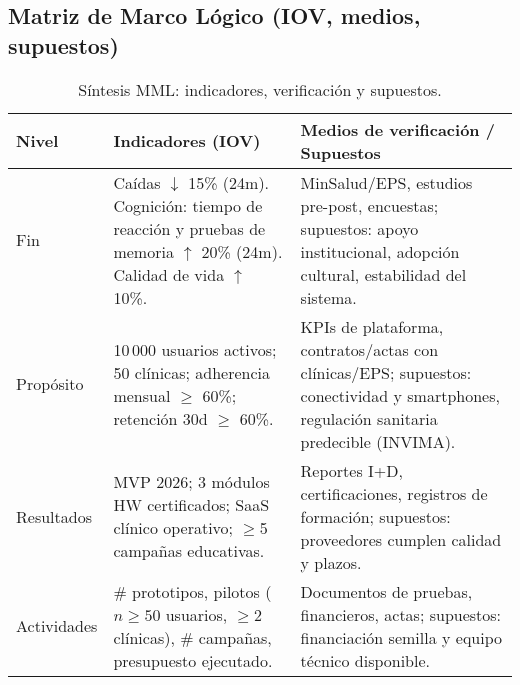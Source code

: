\subsection{Matriz de Marco Lógico (IOV, medios, supuestos)}
\begin{table}[h]
\centering
\begin{tabular}{p{3.2cm} p{5.6cm} p{5.6cm}}
\hline
\textbf{Nivel} & \textbf{Indicadores (IOV)} & \textbf{Medios de verificación / Supuestos}\\
\hline
Fin & Caídas $\downarrow$ 15\% (24m). Cognición: tiempo de reacción y pruebas de memoria $\uparrow$ 20\% (24m). Calidad de vida $\uparrow$ 10\%. & MinSalud/EPS, estudios pre-post, encuestas; supuestos: apoyo institucional, adopción cultural, estabilidad del sistema.\\
Propósito & 10\,000 usuarios activos; 50 clínicas; adherencia mensual $\geq$ 60\%; retención 30d $\geq$ 60\%. & KPIs de plataforma, contratos/actas con clínicas/EPS; supuestos: conectividad y smartphones, regulación sanitaria predecible (INVIMA).\\
Resultados & MVP 2026; 3 módulos HW certificados; SaaS clínico operativo; $\geq$5 campañas educativas. & Reportes I+D, certificaciones, registros de formación; supuestos: proveedores cumplen calidad y plazos.\\
Actividades & \# prototipos, pilotos ($n\ge 50$ usuarios, $\ge 2$ clínicas), \# campañas, presupuesto ejecutado. & Documentos de pruebas, financieros, actas; supuestos: financiación semilla y equipo técnico disponible.\\
\hline
\end{tabular}
\caption{Síntesis MML: indicadores, verificación y supuestos.}
\end{table}
